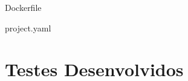 \documentclass[a4paper,12pt]{article}
\begin{document}
Dockerfile






project.yaml


\section{Testes Desenvolvidos}
\end{document}
